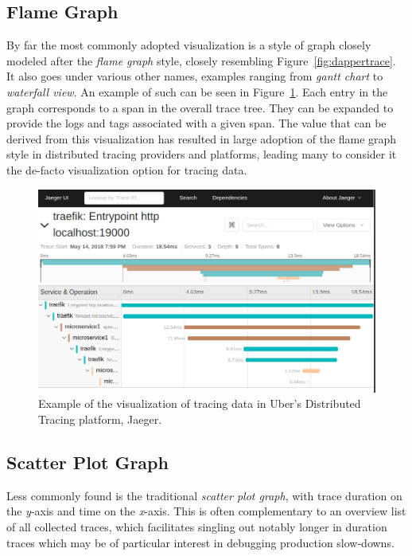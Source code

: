 \documentclass[pdftex,titlepage]{article}
\begin{document}
        \subsection{Flame Graph}
        By far the most commonly adopted visualization is a style of graph closely modeled after the \textit{flame graph}\cite{lightsteptrace}
        \cite{datadogtrace} style, closely resembling Figure~\ref{fig:dappertrace}. It also goes under various other names, 
        examples ranging from \textit{gantt chart}\cite{yuritrace} to \textit{waterfall view}\cite{honeycombtrace}. An example of 
        such can be seen in Figure~\ref{fig:jaeger}. Each entry in the graph corresponds to a span in the overall trace tree. They 
        can be expanded to provide the logs and tags associated with a given span. The value that can be derived from this visualization
        has resulted in large adoption of the flame graph style in distributed tracing providers and platforms, leading many to consider
        it the de-facto visualization option for tracing data.

        \medskip

        \begin{figure}[htb!]
            \centering
            \includegraphics[scale=0.35]{jaeger}
            \caption{Example of the visualization of tracing data in Uber's Distributed Tracing platform, Jaeger\cite{jaeger}.}
            \label{fig:jaeger}
        \end{figure}

        \subsection{Scatter Plot Graph}
        Less commonly found is the traditional \textit{scatter plot graph}, with trace duration on the \textit{y}-axis
        and time on the \textit{x}-axis. This is often complementary to an overview list of all collected traces, which
        facilitates singling out notably longer in duration traces which may be of particular interest in debugging production
        slow-downs\cite{jaegerscatter}\cite{newrelicscatter}\cite{kialiscatter}.
\end{document}
